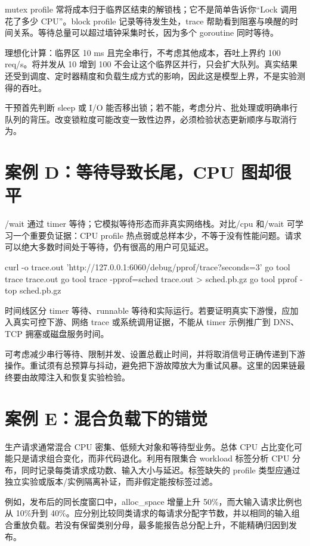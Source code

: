 \documentclass[UTF8,fontset=fandol,openany,11pt]{ctexbook}
\begin{document}
mutex profile 常将成本归于临界区结束的解锁栈；它不是简单告诉你“Lock 调用花了多少 CPU”。block profile 记录等待发生处，trace 帮助看到阻塞与唤醒的时间关系。等待总量可以超过墙钟采集时长，因为多个 goroutine 同时等待。

理想化计算：临界区 10 ms 且完全串行，不考虑其他成本，吞吐上界约 100 req/s。将并发从 10 增到 100 不会让这个临界区并行，只会扩大队列。真实结果还受到调度、定时器精度和负载生成方式的影响，因此这是模型上界，不是实验测得的吞吐。

干预首先判断 sleep 或 I/O 能否移出锁；若不能，考虑分片、批处理或明确串行队列的背压。改变锁粒度可能改变一致性边界，必须检验状态更新顺序与取消行为。

\section{案例 D：等待导致长尾，CPU 图却很平}
/wait 通过 timer 等待；它模拟等待形态而非真实网络栈。对比/cpu 和/wait 可学习一个重要负证据：CPU profile 热点弱或总样本少，不等于没有性能问题。请求可以绝大多数时间处于等待，仍有很高的用户可见延迟。

\begin{codeblock}
curl -o trace.out 'http://127.0.0.1:6060/debug/pprof/trace?seconds=3'
go tool trace trace.out
go tool trace -pprof=sched trace.out > sched.pb.gz
go tool pprof -top sched.pb.gz
\end{codeblock}

时间线区分 timer 等待、runnable 等待和实际运行。若要证明真实下游慢，应加入真实可控下游、网络 trace 或系统调用证据，不能从 timer 示例推广到 DNS、TCP 拥塞或磁盘服务时间。

可考虑减少串行等待、限制并发、设置总截止时间，并将取消信号正确传递到下游操作。重试须有总预算与抖动，避免把下游故障放大为重试风暴。这里的因果链最终要由故障注入和恢复实验检验。

\section{案例 E：混合负载下的错觉}
生产请求通常混合 CPU 密集、低频大对象和等待型业务。总体 CPU 占比变化可能只是请求组合变化，而非代码退化。利用有限集合 workload 标签分析 CPU 分布，同时记录每类请求成功数、输入大小与延迟。标签缺失的 profile 类型应通过独立实验或版本/实例隔离补证，而非假定能按标签过滤。

例如，发布后的同长度窗口中，alloc\_space 增量上升 50\%，而大输入请求比例也从 10\%升到 40\%。应分别比较同类请求的每请求分配字节数，并以相同的输入组合重放负载。若没有保留类别分母，最多能报告总分配上升，不能精确归因到发布。
\end{document}
